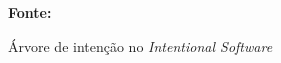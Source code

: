 \begin{figure}[h!]
\centering

\caption{\textmd{Árvore de intenção no \textit{Intentional Software}}}
\label{fig:intentional}

\par\medskip\textbf{Fonte:} \cite{simonyi2006intentional} \par\medskip
\end{figure}
